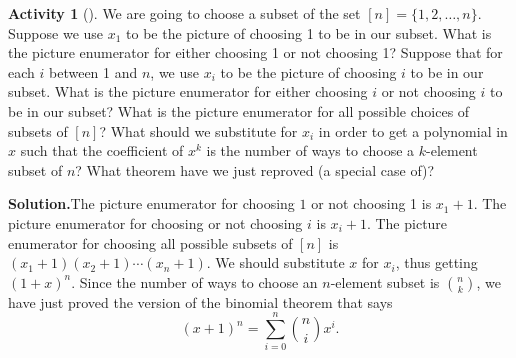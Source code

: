 \documentclass[10pt,]{book}
\theoremstyle{plain}
\theoremstyle{definition}
\newtheorem{activity}[project]{Activity}
\numberwithin{equation}{chapter}
\begin{document}
\begin{activity}[]\label{reprovingbinomialtheorem}
We are going to choose a subset of the set \([n]=\{1,2,\ldots, n\}\). Suppose we use \(x_1\) to be the picture of choosing 1 to be in our subset. What is the picture enumerator for either choosing 1 or not choosing 1? Suppose that for each \(i\) between 1 and \(n\), we use \(x_i\) to be the picture of choosing \(i\) to be in our subset. What is the picture enumerator for either choosing \(i\) or not choosing \(i\) to be in our subset? What is the picture enumerator for all possible choices of subsets of \([n]\)? What should we substitute for \(x_i\) in order to get a polynomial in \(x\) such that the coefficient of \(x^k\) is the number of ways to choose a \(k\)-element subset of \(n\)? What theorem have we just reproved (a special case of)?%
\par\medskip\noindent%
\textbf{Solution.}\quad The picture enumerator for choosing \(1\) or not choosing 1 is \(x_1+1\). The picture enumerator for choosing or not choosing \(i\) is \(x_i+1\).  The picture enumerator for choosing all possible subsets of \([n]\) is \((x_1+1)(x_2+1)\cdots(x_n+1).\) We should substitute \(x\) for \(x_i\), thus getting \((1+x)^n\). Since the number of ways to choose an \(n\)-element subset is \(\binom{n}{k}\), we have just proved the version of the binomial theorem that says%
\begin{equation*}
(x+1)^n=\sum_{i=0}^n \binom{n}{i}x^i.
\end{equation*}
%
\end{activity}
\end{document}
